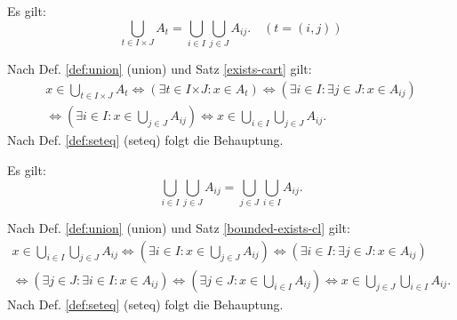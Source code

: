 \begin{Satz}\label{cup-cart}
Es gilt:
\[\bigcup_{t\in I\times J} A_t
= \bigcup_{i\in I}\bigcup_{j\in J} A_{ij}.\quad (t=(i,j))\]
\end{Satz}

\begin{Beweis}
Nach Def. \ref{def:union} (union) und Satz \ref{exists-cart} gilt:
\begin{gather*}
x\in \bigcup_{t\in I\times J} A_t
\iff (\exists t\in I{\times J}\colon x\in A_t)
\iff (\exists i{\in}I\colon\exists j{\in}J\colon x\in A_{ij})\\
\iff (\exists i{\in}I\colon x\in \bigcup_{j\in J} A_{ij})
\iff x\in\bigcup_{i\in I}\bigcup_{j\in J} A_{ij}.
\end{gather*}
Nach Def. \ref{def:seteq} (seteq) folgt die Behauptung.\,\qedsymbol
\end{Beweis}

\begin{Satz}
Es gilt:
\[\bigcup_{i\in I}\bigcup_{j\in J} A_{ij}
= \bigcup_{j\in J}\bigcup_{i\in I} A_{ij}.\]
\end{Satz}

\begin{Beweis}
Nach Def. \ref{def:union} (union) und Satz \ref{bounded-exists-cl} gilt:
\begin{gather*}
x\in\bigcup_{i\in I}\bigcup_{j\in J} A_{ij}
\iff (\exists i{\in}I\colon x\in\bigcup_{j\in J} A_{ij})
\iff (\exists i{\in}I\colon\exists j{\in}J\colon x\in A_{ij})\\
\iff (\exists j{\in}J\colon\exists i{\in}I\colon x\in A_{ij})
\iff (\exists j{\in}J\colon x\in \bigcup_{i\in I}A_{ij})
\iff x\in\bigcup_{j\in J}\bigcup_{i\in I} A_{ij}.
\end{gather*}
Nach Def. \ref{def:seteq} (seteq) folgt die Behauptung.\,\qedsymbol
\end{Beweis}

